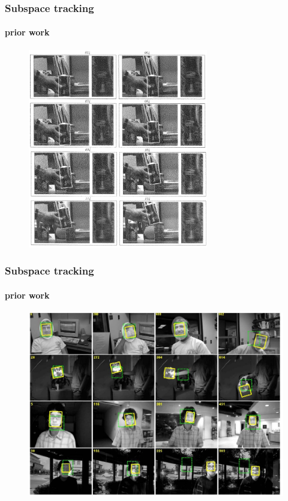 \begin{frame}
\frametitle{Subspace tracking}
\framesubtitle{prior work}
\logoCSIPCPL\mypagenum
	\begin{figure}
		\includegraphics[width=0.7\textwidth]{thesis/TrackingPapers_SubspaceTracking_1998_Black_fig9.png}
	\end{figure}
\end{frame}



\begin{frame}
\frametitle{Subspace tracking}
\framesubtitle{prior work}
\logoCSIPCPL\mypagenum
	\begin{figure}
		\includegraphics[width=1.0\textwidth]{thesis/TrackingPapers_SubspaceTracking_2008_Ross_fig10.png}
	\end{figure}
\end{frame}



